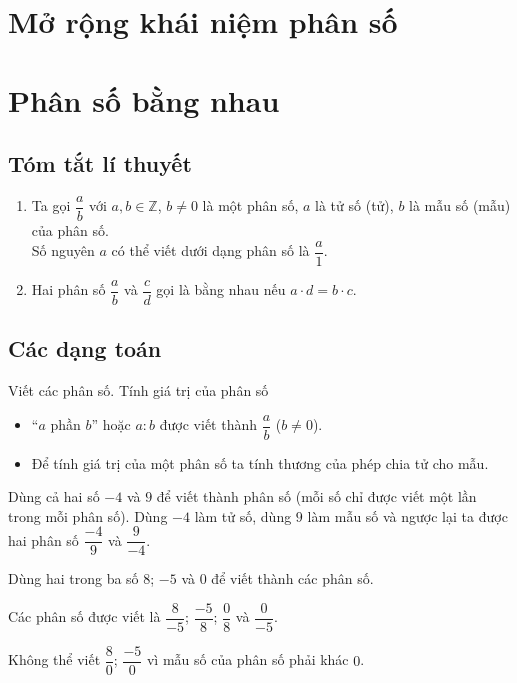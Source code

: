 \section{Mở rộng khái niệm phân số}
\section{Phân số bằng nhau}
\subsection{Tóm tắt lí thuyết}
 \begin{enumerate}
  \item Ta gọi $\dfrac{a}{b}$ với $a,b\in\mathbb{Z}$, $b\neq 0$ là một phân số, $a$ là tử số (tử), $b$ là mẫu số (mẫu) của phân số.\\
  Số nguyên $a$ có thể viết dưới dạng phân số là $\dfrac{a}{1}$.
  \item Hai phân số $\dfrac{a}{b}$ và $\dfrac{c}{d}$ gọi là bằng nhau nếu $a \cdot d = b \cdot c$.
 \end{enumerate}

\subsection{Các dạng toán}

\begin{dang}{Viết các phân số. Tính giá trị của phân số}
 \begin{itemize}
  \item ``$a$ phần $b$'' hoặc $a : b$ được viết thành $\dfrac{a}{b}$ ($b\neq 0$).
  \item Để tính giá trị của một phân số ta tính thương của phép chia tử cho mẫu.
 \end{itemize}
\end{dang}

\begin{vd}%
 Dùng cả hai số $-4$ và $9$ để viết thành phân số (mỗi số chỉ được viết một lần trong mỗi phân số).
 \loigiai
  {
  Dùng $-4$ làm tử số, dùng $9$ làm mẫu số và ngược lại ta được hai phân số $\dfrac{-4}{9}$ và $\dfrac{9}{-4}$.
  }
\end{vd}

\begin{vd}%
 Dùng hai trong ba số $8$; $-5$ và $0$ để viết thành các phân số.
 \loigiai
  {
  Các phân số được viết là $\dfrac{8}{-5}$; $\dfrac{-5}{8}$; $\dfrac{0}{8}$ và $\dfrac{0}{-5}$.
  \begin{note}
  	Không thể viết $\dfrac{8}{0}$; $\dfrac{-5}{0}$ vì mẫu số của phân số phải khác $0$.
  \end{note}
  }
\end{vd}

